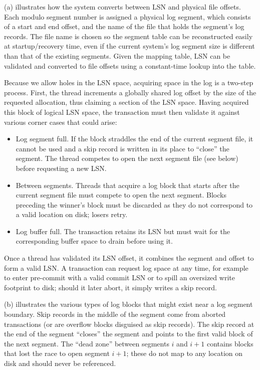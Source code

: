 
(a) illustrates how the system converts between LSN and physical file offsets. Each modulo segment number is assigned a physical log segment, which consists of a start and end offset, and the name of the file that holds the segment's log records. The file name is chosen so the segment table can be reconstructed easily at startup/recovery time, even if the current system's log segment size is different than that of the existing segments. Given the mapping table, LSN can be validated and converted to file offsets using a constant-time lookup into the table.

Because we allow holes in the LSN space, acquiring space in the log is a two-step process. First, the thread increments a globally shared log offset by the size of the requested allocation, thus claiming a section of the LSN space. Having acquired this block of logical LSN space, the transaction must then validate it against various corner cases that could arise:
\begin{itemize}
\item Log segment full. If the block straddles the end of the current segment file, it cannot be used and a skip record is written in its place to ``close'' the segment. The thread competes to open the next segment file (see below) before requesting a new LSN.
\item Between segments. Threads that acquire a log block that starts after the current segment file must compete to open the next segment. Blocks preceding the winner's block must be discarded as they do not correspond to a valid location on disk; losers retry.
\item Log buffer full. The transaction retains its LSN but must wait for the corresponding buffer space to drain before using it.
\end{itemize}

Once a thread has validated its LSN offset, it combines the segment and offset to form a valid LSN. A transaction can request log space at any time, for example to enter pre-commit with a valid commit LSN or to spill an oversized write footprint to disk; should it later abort, it simply writes a skip record.

(b) illustrates the various types of log blocks that might exist near a log segment boundary. Skip records in the middle of the segment come from aborted transactions (or are overflow blocks disguised as skip records). The skip record at the end of the segment ``closes'' the segment and points to the first valid block of the next segment. The ``dead zone'' between segments $i$ and $i+1$ contains blocks that lost the race to open segment $i+1$; these do not map to any location on disk and should never be referenced. 

